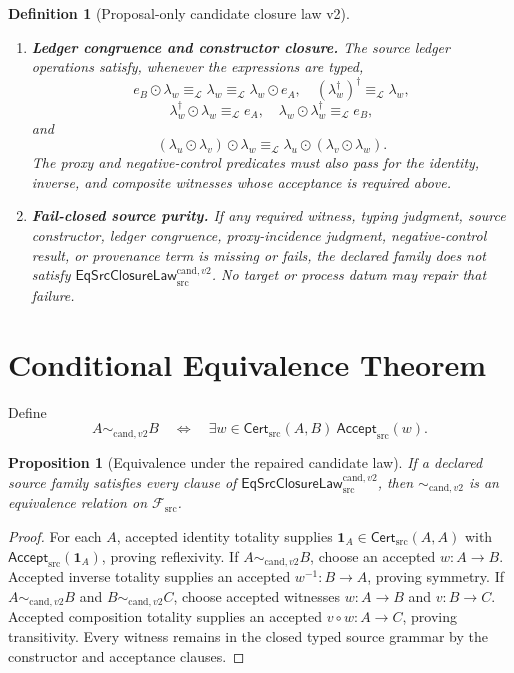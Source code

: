 \documentclass[11pt]{article}
\newtheorem{definition}{Definition}
\newtheorem{proposition}{Proposition}
\newcommand{\Cert}{\mathsf{Cert}_{\mathrm{src}}}
\newcommand{\Accept}{\mathsf{Accept}_{\mathrm{src}}}
\newcommand{\Law}{\mathsf{EqSrcClosureLaw}^{\mathrm{cand},v2}_{\mathrm{src}}}
\begin{document}
\begin{definition}[Proposal-only candidate closure law v2]
\begin{enumerate}[leftmargin=*]
  \item \textbf{Ledger congruence and constructor closure.}
  The source ledger operations satisfy, whenever the expressions are typed,
  \[
  e_B\odot\lambda_w\equiv_{\mathcal L}\lambda_w
  \equiv_{\mathcal L}\lambda_w\odot e_A,\quad
  (\lambda_w^\dagger)^\dagger\equiv_{\mathcal L}\lambda_w,
  \]
  \[
  \lambda_w^\dagger\odot\lambda_w
  \equiv_{\mathcal L}e_A,\quad
  \lambda_w\odot\lambda_w^\dagger
  \equiv_{\mathcal L}e_B,
  \]
  and
  \[
  (\lambda_u\odot\lambda_v)\odot\lambda_w
  \equiv_{\mathcal L}
  \lambda_u\odot(\lambda_v\odot\lambda_w).
  \]
  The proxy and negative-control predicates must also pass for the identity,
  inverse, and composite witnesses whose acceptance is required above.

  \item \textbf{Fail-closed source purity.}
  If any required witness, typing judgment, source constructor, ledger
  congruence, proxy-incidence judgment, negative-control result, or provenance
  term is missing or fails, the declared family does not satisfy \(\Law\).
  No target or process datum may repair that failure.
\end{enumerate}
\end{definition}

\section{Conditional Equivalence Theorem}

Define
\[
 A\sim_{\mathrm{cand},v2}B
 \quad\Longleftrightarrow\quad
 \exists w\in\Cert(A,B)\ \Accept(w).
\]

\begin{proposition}[Equivalence under the repaired candidate law]
If a declared source family satisfies every clause of \(\Law\), then
\(\sim_{\mathrm{cand},v2}\) is an equivalence relation on
\(\mathcal F_{\mathrm{src}}\).
\end{proposition}

\begin{proof}
For each \(A\), accepted identity totality supplies
\(\mathbf 1_A\in\Cert(A,A)\) with \(\Accept(\mathbf 1_A)\), proving
reflexivity. If \(A\sim_{\mathrm{cand},v2}B\), choose an accepted
\(w:A\to B\). Accepted inverse totality supplies an accepted
\(w^{-1}:B\to A\), proving symmetry. If
\(A\sim_{\mathrm{cand},v2}B\) and
\(B\sim_{\mathrm{cand},v2}C\), choose accepted witnesses
\(w:A\to B\) and \(v:B\to C\). Accepted composition totality supplies an
accepted \(v\circ w:A\to C\), proving transitivity. Every witness remains in
the closed typed source grammar by the constructor and acceptance clauses.
\end{proof}
\end{document}

